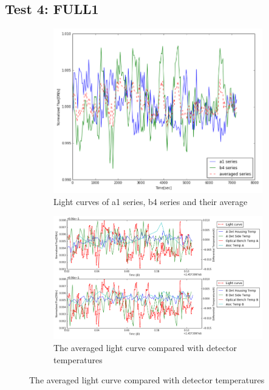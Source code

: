 \documentclass{aastex6}
\begin{document}
\subsection{Test 4: FULL1} 
\begin{figure}[H]
    \centering
    \begin{subfigure}{1}
        \includegraphics[scale=0.4]{ts_test4}
        \caption{Light curves of a1 series, b4 series and their average}
    \end{subfigure}

    \begin{subfigure}{2}
        \includegraphics[scale=0.4]{temp_test4}
        \caption{The averaged light curve compared with detector temperatures}
    \end{subfigure}
   

\end{figure}
\end{document}
